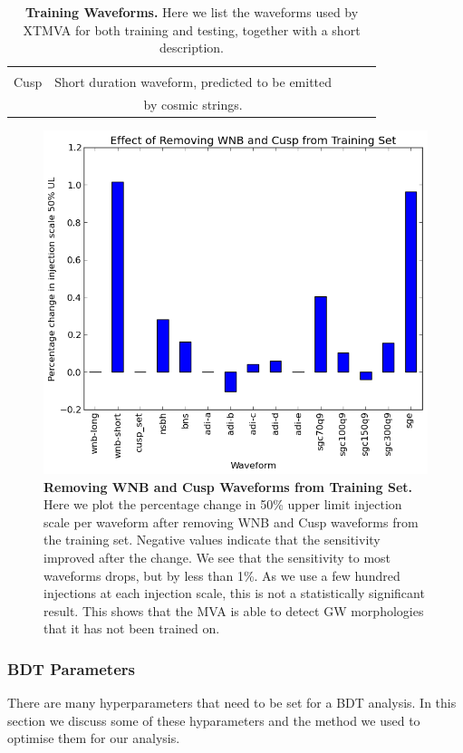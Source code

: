 \documentclass[11pt]{cuthesis}
\begin{document}
\begin{table}
\begin{tabular}{| c | c | c | c | c |}
\hline
& \\
Cusp & Short duration waveform, predicted to be emitted \\ & by cosmic strings. \\

\hline

\end{tabular}
\caption{\textbf{Training Waveforms.} Here we list the waveforms used by XTMVA for both training and testing, together with a short description.}
\end{table}



\begin{figure} %
\begin{center}
\includegraphics[width=0.8\linewidth]{pc_change_removing_wnb_cusp.png}
\end{center}
\caption{\textbf{Removing WNB and Cusp Waveforms from Training Set.} Here we plot the percentage change in 50\% upper limit injection scale per waveform after removing WNB and Cusp waveforms from the training set. Negative values indicate that the sensitivity improved after the change. We see that the sensitivity to most waveforms drops, but by less than 1\%. As we use a few hundred injections at each injection scale, this is not a statistically significant result. This shows that the MVA is able to detect GW morphologies that it has not been trained on. }
\label{fig:no wnb or cusp}
\end{figure}

\subsubsection{BDT Parameters}
There are many hyperparameters that need to be set for a BDT analysis. In this section we discuss some of these hyparameters and the method we used to optimise them for our analysis. 
\end{document}
